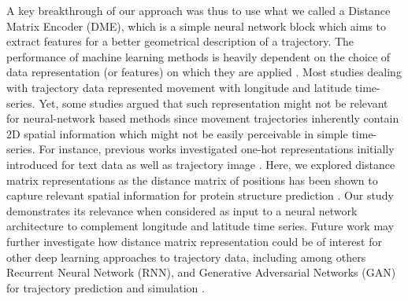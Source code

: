 \documentclass{article}
\begin{document}
A key breakthrough of our approach was thus to use what we called a Distance Matrix Encoder (DME), which is a simple neural network block which aims to extract features for a better geometrical description of a trajectory.
The performance of machine learning methods is heavily dependent on the choice of data representation (or features) on which they are applied \cite{bengio_representation_2014}.
Most studies dealing with trajectory data represented movement with longitude and latitude time-series. Yet, some studies argued that such representation might not be relevant for neural-network based methods since movement trajectories inherently contain 2D spatial information which might not be easily perceivable in simple time-series. For instance, previous works  investigated one-hot representations initially introduced for text data  \cite{nguyen_geotracknet-maritime_2021} as well as trajectory image \cite{endo_classifying_2016}. Here, we explored distance matrix representations as the distance matrix of positions has been shown to capture relevant spatial information for protein structure prediction \cite{senior_improved_2020, xu_analysis_2019}. Our study  demonstrates its relevance when considered as input to a neural network architecture to complement longitude and latitude time series. Future work may further investigate how distance matrix representation could be of interest for other deep learning approaches to trajectory data, including among others Recurrent Neural Network (RNN), and Generative Adversarial Networks (GAN) for trajectory prediction and simulation \cite{ardakani_encoding_2017,goodfellow_generative_2014,isola_image--image_2018,rew_animal_2019}.
\end{document}
